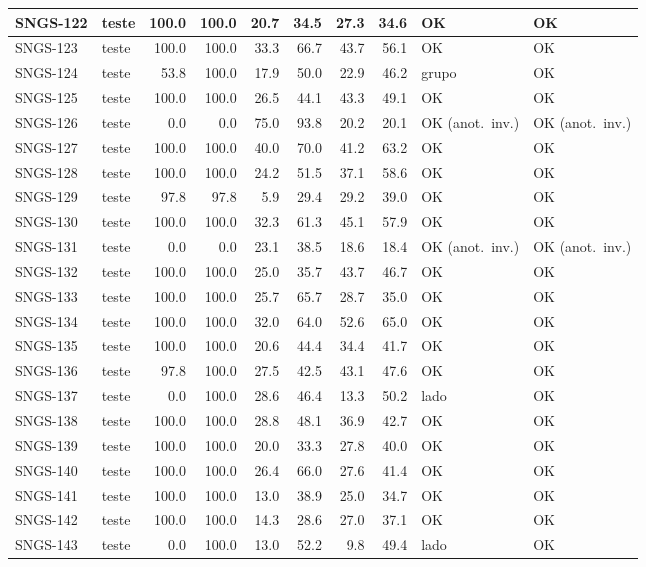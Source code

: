 \begin{small}
\begin{longtable}{|l|l|r|r|r|r|r|r|l|l|}
SNGS-122 & teste & 100.0 & 100.0 & 20.7 & 34.5 & 27.3 & 34.6 & OK & OK \\ \hline
SNGS-123 & teste & 100.0 & 100.0 & 33.3 & 66.7 & 43.7 & 56.1 & OK & OK \\ \hline
SNGS-124 & teste & 53.8 & 100.0 & 17.9 & 50.0 & 22.9 & 46.2 & grupo & OK \\ \hline
SNGS-125 & teste & 100.0 & 100.0 & 26.5 & 44.1 & 43.3 & 49.1 & OK & OK \\ \hline
SNGS-126 & teste & 0.0 & 0.0 & 75.0 & 93.8 & 20.2 & 20.1 & OK (anot.\ inv.) & OK (anot.\ inv.) \\ \hline
SNGS-127 & teste & 100.0 & 100.0 & 40.0 & 70.0 & 41.2 & 63.2 & OK & OK \\ \hline
SNGS-128 & teste & 100.0 & 100.0 & 24.2 & 51.5 & 37.1 & 58.6 & OK & OK \\ \hline
SNGS-129 & teste & 97.8 & 97.8 & 5.9 & 29.4 & 29.2 & 39.0 & OK & OK \\ \hline
SNGS-130 & teste & 100.0 & 100.0 & 32.3 & 61.3 & 45.1 & 57.9 & OK & OK \\ \hline
SNGS-131 & teste & 0.0 & 0.0 & 23.1 & 38.5 & 18.6 & 18.4 & OK (anot.\ inv.) & OK (anot.\ inv.) \\ \hline
SNGS-132 & teste & 100.0 & 100.0 & 25.0 & 35.7 & 43.7 & 46.7 & OK & OK \\ \hline
SNGS-133 & teste & 100.0 & 100.0 & 25.7 & 65.7 & 28.7 & 35.0 & OK & OK \\ \hline
SNGS-134 & teste & 100.0 & 100.0 & 32.0 & 64.0 & 52.6 & 65.0 & OK & OK \\ \hline
SNGS-135 & teste & 100.0 & 100.0 & 20.6 & 44.4 & 34.4 & 41.7 & OK & OK \\ \hline
SNGS-136 & teste & 97.8 & 100.0 & 27.5 & 42.5 & 43.1 & 47.6 & OK & OK \\ \hline
SNGS-137 & teste & 0.0 & 100.0 & 28.6 & 46.4 & 13.3 & 50.2 & lado & OK \\ \hline
SNGS-138 & teste & 100.0 & 100.0 & 28.8 & 48.1 & 36.9 & 42.7 & OK & OK \\ \hline
SNGS-139 & teste & 100.0 & 100.0 & 20.0 & 33.3 & 27.8 & 40.0 & OK & OK \\ \hline
SNGS-140 & teste & 100.0 & 100.0 & 26.4 & 66.0 & 27.6 & 41.4 & OK & OK \\ \hline
SNGS-141 & teste & 100.0 & 100.0 & 13.0 & 38.9 & 25.0 & 34.7 & OK & OK \\ \hline
SNGS-142 & teste & 100.0 & 100.0 & 14.3 & 28.6 & 27.0 & 37.1 & OK & OK \\ \hline
SNGS-143 & teste & 0.0 & 100.0 & 13.0 & 52.2 & 9.8 & 49.4 & lado & OK \\ \hline

\end{longtable}
\end{small}
